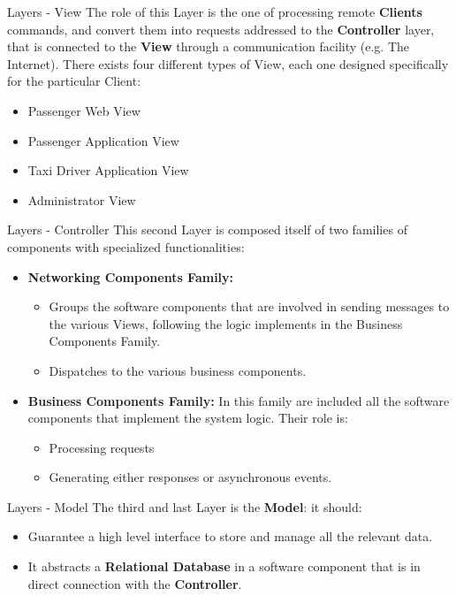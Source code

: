 \documentclass{../common/latex_classes/pdf_presentation}
\begin{document}
	\begin{frame}{Layers - View}
		The role of this Layer is the one of processing remote \textbf{Clients} commands, and convert them into requests addressed to the \textbf{Controller} layer, that is connected to the \textbf{View} through a communication facility (e.g. The Internet).
		There exists four different types of View, each one designed specifically for the particular Client:
		\begin{itemize}
			\item Passenger Web View
			\item Passenger Application View
			\item Taxi Driver Application View
			\item Administrator View
		\end{itemize}
	\end{frame}
	
	\begin{frame}{Layers - Controller}
		This second Layer is composed itself of two families of components with specialized functionalities:
		\begin{itemize}
			\item \textbf{Networking Components Family:}
			\begin{itemize}
				\item Groups the software components that are involved in sending messages to the various Views, following the logic implements in the Business Components Family. 
				\item Dispatches to the various business components.
			\end{itemize}
			\item \textbf{Business Components Family:} In this family are included all the software components that implement the system logic.
			Their role is:
			\begin{itemize}
				\item Processing requests 
				\item Generating either responses or asynchronous events.
			\end{itemize}
		\end{itemize}
	\end{frame}
	
	\begin{frame}{Layers - Model}
		The third and last Layer is the \textbf{Model}: it should:
		\begin{itemize}
			\item Guarantee a high level interface to store and manage all the \myTaxiService{} relevant data. 
			\item It abstracts a \textbf{Relational Database} in a software component that is in direct connection with the \textbf{Controller}.
		\end{itemize}
	\end{frame}
	
\end{document}
